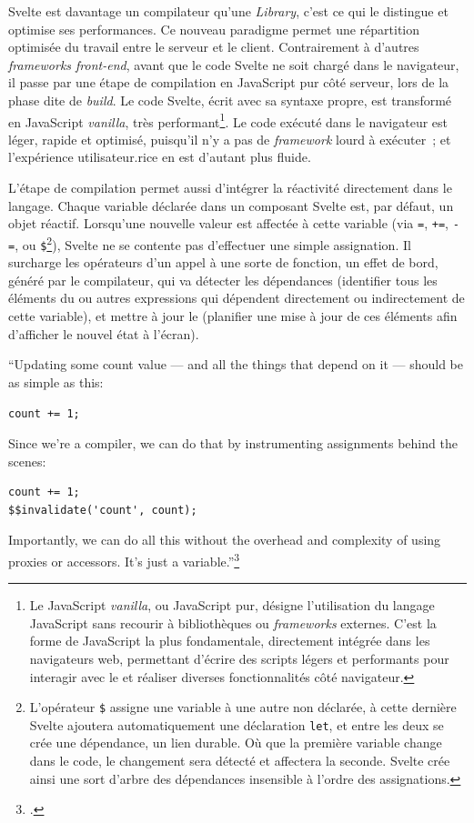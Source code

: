 Svelte est davantage un compilateur qu'une \textit{Library}, c'est ce qui le
distingue et optimise ses performances. Ce nouveau paradigme permet une
répartition optimisée du travail entre le serveur et le client.
Contrairement à d'autres \textit{frameworks front-end}, avant que le code Svelte
ne soit chargé dans le navigateur, il passe par une étape de compilation
en JavaScript pur côté serveur, lors de la phase dite de \textit{build}. Le
code Svelte, écrit avec sa syntaxe propre, est transformé en JavaScript
\emph{vanilla}, très performant\footnote{Le JavaScript \textit{vanilla}, ou
  JavaScript pur, désigne l'utilisation du langage JavaScript sans
  recourir à bibliothèques ou \textit{frameworks} externes. C'est la forme de
  JavaScript la plus fondamentale, directement intégrée dans les
  navigateurs web, permettant d'écrire des scripts légers et performants
  pour interagir avec le \dom et réaliser diverses fonctionnalités côté
  navigateur.}. Le code exécuté dans le navigateur est léger, rapide et
optimisé, puisqu'il n'y a pas de \textit{framework} lourd à exécuter~; et
l'expérience utilisateur.rice en est d'autant plus fluide.

L'étape de compilation permet aussi d'intégrer la réactivité directement
dans le langage. Chaque variable déclarée dans un composant Svelte est,
par défaut, un objet réactif. Lorsqu'une nouvelle valeur est affectée à
cette variable (via \texttt{=}, \texttt{+=}, \texttt{-=}, ou
\texttt{\$}\footnote{L'opérateur \texttt{\$} assigne une variable à une
  autre non déclarée, à cette dernière Svelte ajoutera automatiquement
  une déclaration \texttt{let}, et entre les deux se crée une
  dépendance, un lien durable. Où que la première variable change dans
  le code, le changement sera détecté et affectera la seconde. Svelte
  crée ainsi une sort d'arbre des dépendances insensible à l'ordre des assignations.}), Svelte
ne se contente pas d'effectuer une simple assignation. Il surcharge les
opérateurs d'un appel à une sorte de fonction, un effet de bord, généré par
le compilateur, qui va détecter les dépendances (identifier tous les
éléments du \dom ou autres expressions qui dépendent directement ou
indirectement de cette variable), et mettre à jour le \dom (planifier une
mise à jour de ces éléments afin d'afficher le nouvel état à l'écran).

\begin{kwote}
``Updating some count value --- and all the things that depend on it ---
should be as simple as this:

\texttt{count\ +=\ 1;}

Since we're a compiler, we can do that by instrumenting assignments
behind the scenes:

\begin{verbatim}
count += 1;
$$invalidate('count', count);
\end{verbatim}

Importantly, we can do all this without the overhead and complexity of
using proxies or accessors. It's just a variable.''\footcite{harris_svelte_2019}
\end{kwote}

